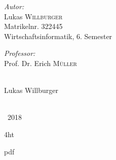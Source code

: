 \documentclass[
  fontsize=12pt, %
  a4paper,  %
  oneside,  %
  bibliography=totoc,
  headsepline,
  cleardoublepage=empty,
  parskip=half,
  draft=false
]{scrbook}
\begin{document}
\begin{titlepage}

\begin{minipage}{0.4\textwidth}

\emph{Autor:}\\
Lukas \textsc{Willburger}\\ %
Matrikelnr. 322445 \\
Wirtschaftsinformatik, 6. Semester \\ \newline 


\emph{Professor: }\\
Prof. Dr. Erich \textsc{Müller} \\ \newline  \newline

\hrulefill \\
\centering Lukas Willburger
\end{minipage}\\[1cm]






{\textcopyright\ 2018}\\[2cm] %

\vfill %

\end{titlepage}

\iftex4ht
  \Configure{$}{\PicMath}{\EndPicMath}{}

  {pdf}
  {%
  }
\fi
\end{document}

